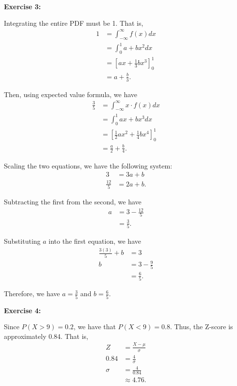 \documentclass[12pt]{article}
\begin{document}
\noindent{}\textbf{Exercise 3:}

Integrating the entire PDF must be 1. That is,
\begin{align*}
    1 & = \int_{-\infty}^{\infty} f(x) dx \\
      & =\int_0^1 a+bx^2 dx               \\
      & = [ax + \frac{1}{3}bx^3]^1_0      \\
      & = a + \frac{b}{3}.
\end{align*}

Then, using expected value formula, we have
\begin{align*}
    \frac{3}{5} & = \int_{-\infty}^{\infty} x \cdot f(x) dx \\
                & =\int_0^1 ax+bx^3 dx                      \\
                & = [\frac{1}{2}ax^2 + \frac{1}{4}bx^4]^1_0 \\
                & = \frac{a}{2} + \frac{b}{4}.
\end{align*}

Scaling the two equations, we have the following system:
\begin{align*}
    3            & = 3a + b  \\
    \frac{12}{5} & = 2a + b.
\end{align*}

Subtracting the first from the second, we have
\begin{align*}
    a & = 3 - \frac{12}{5} \\
      & = \frac{3}{5}.
\end{align*}

Substituting $a$ into the first equation, we have
\begin{align*}
    \frac{3(3)}{5} + b & = 3               \\
    b                  & = 3 - \frac{9}{5} \\
                       & = \frac{6}{5}.
\end{align*}

Therefore, we have $a = \frac{3}{5}$ and $b = \frac{6}{5}$.

\noindent{}\textbf{Exercise 4:}

Since $P(X > 9) = 0.2$, we have that $P(X < 9) = 0.8$.
Thus, the Z-score is approximately 0.84. That is,
\begin{align*}
    Z      & = \frac{X - \mu}{\sigma} \\
    0.84   & = \frac{4}{\sigma}       \\
    \sigma & = \frac{4}{0.84}         \\
           & \approx 4.76.
\end{align*}
\end{document}
